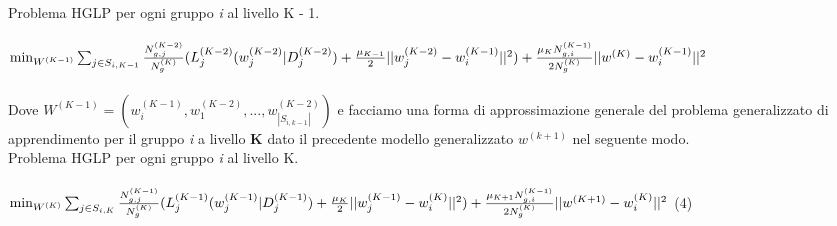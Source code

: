 \begin{itemize}
Problema HGLP per ogni gruppo \textsl{i} al livello K - 1.\\\\
$\min_{W^{(K-1)}}\sum_{j\in S_{i,K-1}} \frac{N_{g,j}^{(K-2)}}{N_g^{(K)}}(L_j^{(K-2)}(w_j^{(K-2)}|D_j^{(K-2)}) \\+\frac{\mu_{K-1}}{2}||w_j^{(K-2)}-w_i^{(K-1)}||^2)+ \frac{\mu_{K}N_{g,i}^{(K-1)}}{2N_g^{(K)}}||w^{(K)}-w_i^{(K-1)}||^2$\\\\
Dove $W^{(K-1)} = (w_i^{(K-1)},w_1^{(K-2)},...,w_{|S_{i,k-1}|}^{(K-2)})$ e facciamo una forma di approssimazione generale del problema generalizzato di apprendimento per il gruppo \textsl{i} a livello \textbf{K} dato il precedente modello generalizzato $w^{(k+1)}$ nel seguente modo.\\
Problema HGLP per ogni gruppo \textsl{i} al livello K.\\\\
$\min_{W^{(K)}}\sum_{j\in S_{i,K}} \frac{N_{g,j}^{(K-1)}}{N_g^{(K)}}(L_j^{(K-1)}(w_j^{(K-1)}|D_j^{(K-1)}) \\+\frac{\mu_{K}}{2}||w_j^{(K-1)}-w_i^{(K)}||^2)+ \frac{\mu_{K+1}N_{g,i}^{(K-1)}}{2N_g^{(K)}}||w^{(K+1)}-w_i^{(K)}||^2$ \hspace{1cm} (4)\\\\\\


\end{itemize}
